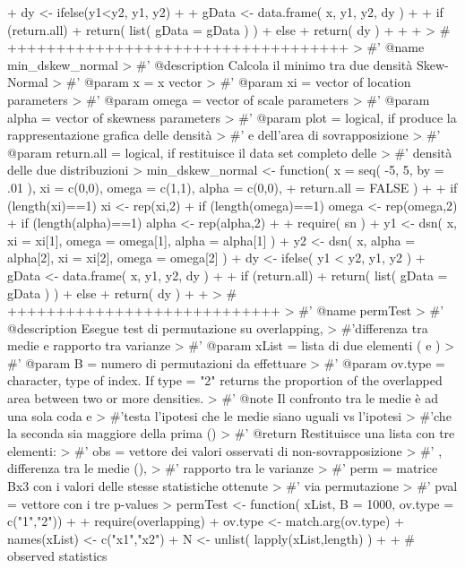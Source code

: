 \documentclass[twocolumn]{article}
\begin{document}
\begin{Schunk}
\begin{Sinput}
{+   dy <- ifelse(y1<y2, y1, y2)
+   
+   gData <- data.frame( x, y1, y2, dy )  
+   
+   if (return.all) {
+     return( list( gData = gData ) )
+   } else {
+     return( dy )  
+   }
+ 
+ }
> # +++++++++++++++++++++++++++++++++++
> #' @name min_dskew_normal
> #' @description Calcola il minimo tra due densità Skew-Normal
> #' @param x = x vector
> #' @param xi = vector of location parameters
> #' @param omega = vector of scale parameters
> #' @param alpha = vector of skewness parameters
> #' @param plot = logical, if  produce la rappresentazione grafica delle densità 
> #' e dell'area di sovrapposizione
> #' @param return.all = logical, if  restituisce il data set completo delle 
> #' densità delle due distribuzioni
> min_dskew_normal <- function( x = seq( -5, 5, by = .01 ), xi = c(0,0), omega = c(1,1), alpha = c(0,0), 
+                               return.all = FALSE ) {
+   
+   if (length(xi)==1) xi <- rep(xi,2)
+   if (length(omega)==1) omega <- rep(omega,2)
+   if (length(alpha)==1) alpha <- rep(alpha,2)
+   
+   require( sn )
+   y1 <- dsn( x, xi = xi[1], omega = omega[1], alpha = alpha[1] )
+   y2 <- dsn( x, alpha = alpha[2], xi = xi[2], omega = omega[2] )
+   dy <- ifelse( y1 < y2, y1, y2 )
+   gData <- data.frame( x, y1, y2, dy )  
+   
+   if (return.all) {
+     return( list( gData = gData ) )
+   } else {
+     return( dy )  
+   }
+ }
> # ++++++++++++++++++++++++++++
> #' @name permTest
> #' @description Esegue test di permutazione su overlapping, 
> #'differenza tra medie e rapporto tra varianze
> #' @param xList = lista di due elementi ( e  ) 
> #' @param B = numero di permutazioni da effettuare
> #' @param ov.type = character, type of index. If type = "2" returns the proportion of the overlapped area between two or more densities. 
> #' @note Il confronto tra le medie è ad una sola coda e 
> #'testa l'ipotesi che le medie siano uguali vs l'ipotesi
> #'che la seconda sia maggiore della prima ()
> #' @return Restituisce una lista con tre elementi:
> #' obs = vettore dei valori osservati di non-sovrapposizione 
> #'       , differenza tra le medie (), 
> #'       rapporto tra le varianze
> #' perm = matrice Bx3 con i valori delle stesse statistiche ottenute
> #'        via permutazione
> #' pval = vettore con i tre p-values   
> permTest <- function( xList, B = 1000, ov.type = c("1","2")) {
+   
+   require(overlapping)
+   ov.type <- match.arg(ov.type)
+   names(xList) <- c("x1","x2")
+   N <- unlist( lapply(xList,length) )
+   
+   # observed statistics
}
\end{Sinput}
\end{Schunk}
\end{document}
